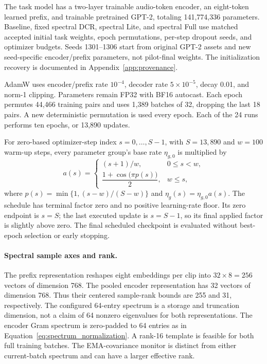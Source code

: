 \documentclass[a4paper,fleqn]{cas-dc}
\begin{document}
The task model has a two-layer trainable audio-token encoder,
an eight-token learned prefix, and trainable pretrained GPT-2,
totaling 141,774,336 parameters.
Baseline, fixed spectral DCR, spectral Lite, and spectral Full
use matched accepted initial task weights, epoch permutations,
per-step dropout seeds, and optimizer budgets.
Seeds 1301--1306 start from original GPT-2 assets and new
seed-specific encoder/prefix parameters, not pilot-final weights.
The initialization recovery is documented in
Appendix~\ref{app:provenance}.

AdamW uses encoder/prefix rate $10^{-4}$, decoder rate
$5\times10^{-5}$, decay 0.01, and norm-1 clipping.
Parameters remain FP32 with BF16 autocast.
Each epoch permutes 44,466 training pairs and uses
1,389 batches of 32, dropping the last 18 pairs.
A new deterministic permutation is used every epoch.
Each of the 24 runs performs ten epochs, or 13,890 updates.

For zero-based optimizer-step index $s=0,\ldots,S-1$, with
$S=13{,}890$ and $w=100$ warm-up steps, every parameter group's
base rate $\eta_{g,0}$ is multiplied by
\begin{equation}
 a(s)=
 \begin{cases}
 (s+1)/w, & 0\le s<w,\\[2pt]
 \dfrac{1+\cos\!\bigl(\pi p(s)\bigr)}{2}, & w\le s,
 \end{cases}
 \label{eq:audio_lr_schedule}
\end{equation}
where $p(s)=\min\{1,(s-w)/(S-w)\}$ and
$\eta_g(s)=\eta_{g,0}a(s)$.
The schedule has terminal factor zero and no positive learning-rate
floor. Its zero endpoint is $s=S$; the last executed update is
$s=S-1$, so its final applied factor is slightly above zero.
The final scheduled checkpoint is evaluated without best-epoch
selection or early stopping.

\paragraph{Spectral sample axes and rank.}
The prefix representation reshapes eight embeddings per clip
into $32\times8=256$ vectors of dimension 768.
The pooled encoder representation has 32 vectors of dimension 768.
Thus their centered sample-rank bounds are 255 and 31,
respectively. The configured 64-entry spectrum is a storage
and truncation dimension, not a claim of 64 nonzero eigenvalues
for both representations. The encoder Gram spectrum is
zero-padded to 64 entries as in
Equation~\eqref{eq:spectrum_normalization}.
A rank-16 template is feasible for both full training batches.
The EMA-covariance monitor is distinct from either current-batch
spectrum and can have a larger effective rank.
\end{document}
